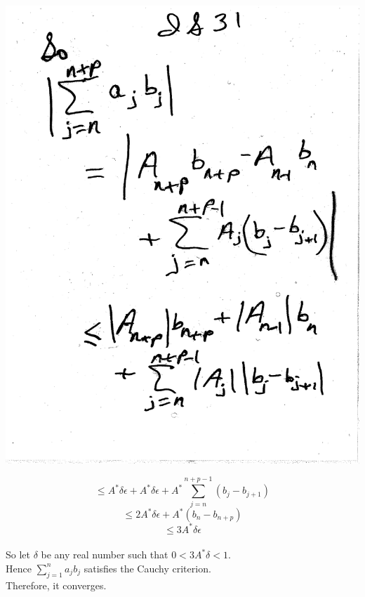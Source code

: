 \documentclass[10pt,a4paper]{article}
\begin{document}
{{\includegraphics[scale=.5]{Pages/IS_31}

\newpage

$$\leq A^*\delta\epsilon + A^*\delta\epsilon + A^*\sum_{j=n}^{n+p-1} (b_j - b_{j+1})$$
$$ \leq 2A^*\delta\epsilon + A^*(b_n - b_{n+p})$$
$$ \leq 3A^*\delta\epsilon$$
\\ \noindent So let $\delta$ be any real number such that $0 < 3A^*\delta < 1$.
\\ \noindent Hence $\sum_{j=1}^n a_j b_j$ satisfies the Cauchy criterion. 
\\ Therefore, it converges.

}}
\end{document}
